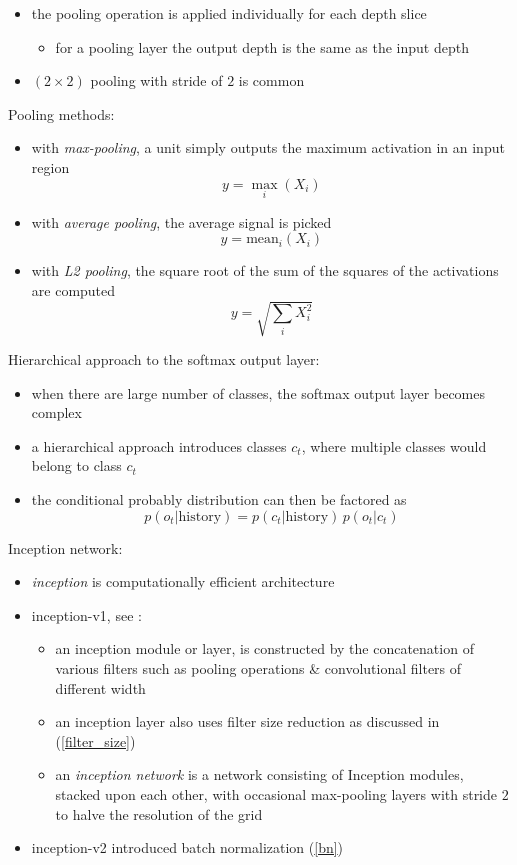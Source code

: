 \documentclass[onecolumn]{IEEEtran}
\newcommand{\beq}{\begin{equation}}
\newcommand{\eeq}{\end{equation}}
\newcommand{\bi}{\begin{itemize}}
\newcommand{\ei}{\end{itemize}}
\begin{document}
\begin{itemize}
         \item  the pooling operation is applied individually for each depth slice
         \bi
             \item for a pooling layer the output depth is the same as the input depth
         \ei
         \item $(2 \times 2)$ pooling with stride of $2$  is common
    \ei
    \item Pooling methods:
    \bi
        \item with \emph{max-pooling}, a unit simply outputs the maximum activation in an input region
        \beq
            y = \max_i(X_i)
        \eeq
        \item with \emph{average pooling}, the average signal is picked
        \beq
            y = \text{mean}_i(X_i)
        \eeq
        \item with \emph{L2 pooling}, the square root of the sum of the squares of the activations are computed
        \beq
            y = \sqrt{\sum_i X_i^2}
        \eeq
    \ei
    \item Hierarchical approach to the softmax output layer:
    \bi
        \item when there are large number of classes, the softmax output layer becomes complex
        \item a hierarchical approach introduces classes $c_t$, where multiple classes would belong to class $c_t$
        \item the conditional probably distribution can then be factored as
        \beq
            p(o_t | \text{history}) =  p(c_t | \text{history}) \, p(o_t|c_t)
        \eeq
    \ei
    \item Inception network:
    \bi
        \item \emph{inception} is computationally efficient  architecture
        \item inception-v1, see \cite{szegedy2015a}:
        \bi
            \item an inception module or layer, is constructed by the concatenation of various filters such as pooling operations \& convolutional filters of different width
            \item an inception layer also uses filter size reduction as discussed in (\ref{filter_size})
            \item an \emph{inception network} is a network consisting of Inception modules, stacked upon each other, with occasional max-pooling layers with stride $2$ to halve the resolution of the grid
        \ei
        \item inception-v2 introduced batch normalization (\ref{bn})

\end{itemize}
\end{document}
